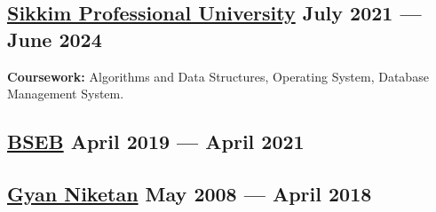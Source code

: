 





\subsection{{\href{https://www.spu.ac/}{Sikkim Professional University} \hfill July 2021 --- June 2024}}

\vspace{0.25em}
\subtext{}\textbf{Coursework:} Algorithms and Data Structures, Operating System, Database Management System.
\vspace{0.2em}
\begin{null}
\end{null}

\subsection{{\href{http://secondary.biharboardonline.com/}{BSEB} \hfill April 2019 --- April 2021}}
\begin{null}

\end{null}

\subsection{{\href{https://www.gyanniketan.in/}{Gyan Niketan} \hfill May 2008 --- April 2018}}
\begin{null}

\end{null}